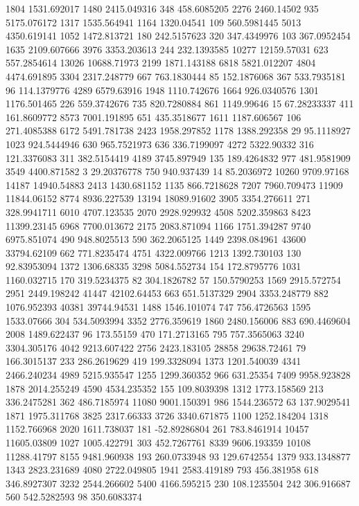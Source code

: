 1804	1531.692017
1480	2415.049316
348	458.6085205
2276	2460.14502
935	5175.076172
1317	1535.564941
1164	1320.04541
109	560.5981445
5013	4350.619141
1052	1472.813721
180	242.5157623
320	347.4349976
103	367.0952454
1635	2109.607666
3976	3353.203613
244	232.1393585
10277	12159.57031
623	557.2854614
13026	10688.71973
2199	1871.143188
6818	5821.012207
4804	4474.691895
3304	2317.248779
667	763.1830444
85	152.1876068
367	533.7935181
96	114.1379776
4289	6579.63916
1948	1110.742676
1664	926.0340576
1301	1176.501465
226	559.3742676
735	820.7280884
861	1149.99646
15	67.28233337
411	161.8609772
8573	7001.191895
651	435.3518677
1611	1187.606567
106	271.4085388
6172	5491.781738
2423	1958.297852
1178	1388.292358
29	95.1118927
1023	924.5444946
630	965.7521973
636	336.7199097
4272	5322.90332
316	121.3376083
311	382.5154419
4189	3745.897949
135	189.4264832
977	481.9581909
3549	4400.871582
3	29.20376778
750	940.937439
14	85.2036972
10260	9709.97168
14187	14940.54883
2413	1430.681152
1135	866.7218628
7207	7960.709473
11909	11844.06152
8774	8936.227539
13194	18089.91602
3905	3354.276611
271	328.9941711
6010	4707.123535
2070	2928.929932
4508	5202.359863
8423	11399.23145
6968	7700.013672
2175	2083.871094
1166	1751.394287
9740	6975.851074
490	948.8025513
590	362.2065125
1449	2398.084961
43600	33794.62109
662	771.8235474
4751	4322.009766
1213	1392.730103
130	92.83953094
1372	1306.68335
3298	5084.552734
154	172.8795776
1031	1160.032715
170	319.5234375
82	304.1826782
57	150.5790253
1569	2915.572754
2951	2449.198242
41447	42102.64453
663	651.5137329
2904	3353.248779
882	1076.952393
40381	39744.94531
1488	1546.101074
747	756.4726563
1595	1533.07666
304	534.5093994
3352	2776.359619
1860	2480.156006
883	690.4469604
2008	1489.622437
96	173.55159
470	171.2713165
795	757.3565063
3240	3304.305176
4042	9213.607422
2756	2423.183105
28858	29638.72461
79	166.3015137
233	286.2619629
419	199.3328094
1373	1201.540039
4341	2466.240234
4989	5215.935547
1255	1299.360352
966	631.25354
7409	9958.923828
1878	2014.255249
4590	4534.235352
155	109.8039398
1312	1773.158569
213	336.2475281
362	486.7185974
11080	9001.150391
986	1544.236572
63	137.9029541
1871	1975.311768
3825	2317.66333
3726	3340.671875
1100	1252.184204
1318	1152.766968
2020	1611.738037
181	-52.89286804
261	783.8461914
10457	11605.03809
1027	1005.422791
303	452.7267761
8339	9606.193359
10108	11288.41797
8155	9481.960938
193	260.0733948
93	129.6742554
1379	933.1348877
1343	2823.231689
4080	2722.049805
1941	2583.419189
793	456.381958
618	346.8927307
3232	2544.266602
5400	4166.595215
230	108.1235504
242	306.916687
560	542.5282593
98	350.6083374
